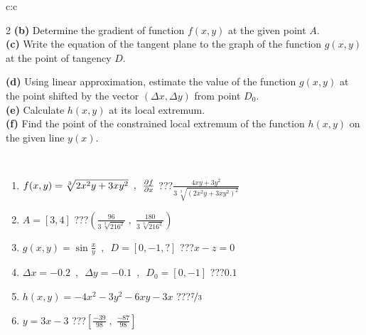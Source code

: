 \documentclass[10pt]{report}
\begin{document}
\begin{tabular}{c:c}
\begin{minipage}[c][104.5mm][t]{0.5\linewidth}
\begin{center}
\begin{minipage}{0.95\linewidth}
\begin{center}
{\begin{multicols}{2}
\textbf{(b)} Determine the gradient of function \(f(x,y)\) at the given point \(A\). \\[1mm]
\textbf{(c)} Write the equation of the tangent plane to the graph of the function \(g(x,y)\) at the point of tangency \(D\). \par \columnbreak
\textbf{(d)} Using linear approximation, estimate the value of the function \(g(x,y)\) at the point shifted by the vector \((\Delta x, \Delta y)\) from point \(D_0\). \\[1mm]
\textbf{(e)} Calculate \(h(x,y)\) at its local extremum. \\[1mm]
\textbf{(f)} Find the point of the constrained local extremum of the function \(h(x,y)\) on the given line \(y(x)\). \\[1mm]
\end{multicols}
}
\end{center}
\end{minipage}
\\[4mm]
\begin{minipage}{0.79\linewidth}
\begin{center}
\begin{varwidth}{\linewidth}
\begin{enumerate}
\normalsizerr
\item $f(x,y) = \sqrt[3]{2x^2y + 3xy^2}\enspace , \enspace \pdv{f}{x}$\quad \dotfill\; ???\;\dotfill \quad $\frac{4xy+3y^2}{3\,\sqrt[3]{(2x^2y+3xy^2)^{2}}}$
\item $A = [3, 4]$\quad \dotfill\; ???\;\dotfill \quad $\left( \frac{96}{3\,\sqrt[3]{216^2}} \;,\; \frac{180}{3\,\sqrt[3]{216^2}} \right)$
\item $g(x,y) = \sin\frac{x}{y} \enspace , \enspace D = [0, -1, ?]$\quad \dotfill\; ???\;\dotfill \quad $x-z=0$
\item $\Delta x = {-0.2} \enspace,\enspace \Delta y = {-0.1} \enspace,\enspace D_0 = [0,-1]$\quad \dotfill\; ???\;\dotfill \quad $0.1$
\item $h(x,y) = -4x^2-3y^2-6xy-3x$\quad \dotfill\; ???\;\dotfill \quad $\nicefrac{7}{3}$
\item $y = 3x-3$\quad \dotfill\; ???\;\dotfill \quad $\left[\frac{-39}{98}\;,\;\frac{-87}{98}\right]$
\end{enumerate}
\end{varwidth}
\end{center}
\end{minipage}
\begin{minipage}{0.20\linewidth}
\begin{center}

\end{center}
\end{minipage}
\end{center}
\end{minipage}
\end{tabular}
\end{document}

